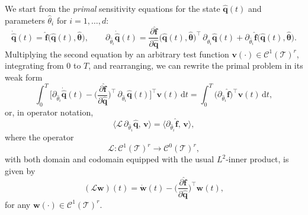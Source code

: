 We start from the \emph{primal} sensitivity equations for the state $\hat{\mathbf{q}}(t)$ and parameters $\hat{\theta}_i$ for $i=1,\dots,d$:\\
$$\dot{\hat{\mathbf{q}}}(t)
= \hat{\mathbf{f}}\bigl(\hat{\mathbf{q}}(t),\hat{\bm{\theta}}\bigr),
\qquad
\partial_{\hat{\theta}_i}\dot{\hat{\mathbf{q}}}(t)
= \frac{\partial \hat{\mathbf{f}}}{\partial \hat{\mathbf{q}}}
  \bigl(\hat{\mathbf{q}}(t),\hat{\bm{\theta}}\bigr)^{\!\top}
  \,\partial_{\hat{\theta}_i}\hat{\mathbf{q}}(t)
+ \partial_{\hat{\theta}_i}\hat{\mathbf{f}}
  \bigl(\hat{\mathbf{q}}(t),\hat{\bm{\theta}}\bigr).$$
Multiplying the second equation by an arbitrary test function $\mathbf{v}(\cdot)\in\mathcal{C}^1(\mathcal{T})^r$, integrating from $0$ to $T$, and rearranging, we can rewrite the primal problem in its weak form\\
$$\int_{0}^{T}
\Biggl[
  \partial_{\hat{\theta}_i}\dot{\hat{\mathbf{q}}}(t)
  - \biggl(\dfrac{\partial \hat{\mathbf{f}}}{\partial \hat{\mathbf{q}}}\biggr)^{\top}\,
    \partial_{\hat{\theta}_i}\hat{\mathbf{q}}(t)
\Biggr]^{\!\top}
\mathbf{v}(t)\,\mathrm{d}t
=
\int_{0}^{T}
\bigl(\partial_{\hat{\theta}_i}\hat{\mathbf{f}}\bigr)^{\!\top}
\mathbf{v}(t)\,\mathrm{d}t,$$
or, in operator notation,\\
$$\langle \mathcal{L}\,\partial_{\hat{\theta}_i}\hat{\mathbf{q}},\,\mathbf{v}\rangle
= \langle \partial_{\hat{\theta}_i}\hat{\mathbf{f}},\,\mathbf{v}\rangle,$$
where the operator\\
$$ \mathcal{L}: \mathcal{C}^1(\mathcal{T})^r\to\mathcal{C}^0(\mathcal{T})^r,$$ 
with both domain and codomain equipped with the usual $L^2$-inner product, is given by\\
$$(\mathcal{L}\mathbf{w})(t) = \dot{\mathbf{w}}(t) - \biggl(\dfrac{\partial \hat{\mathbf{f}}}{\partial \hat{\mathbf{q}}}\biggr)^{\top}\mathbf{w}(t),$$
for any $\mathbf{w}(\cdot)\in\mathcal{C}^1(\mathcal{T})^r$. 


